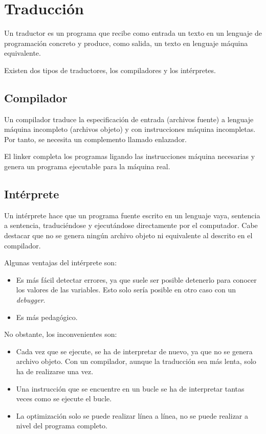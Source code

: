 \section{Traducción}
\begin{definicion}[Traductor]
    Un traductor es un programa que recibe como entrada un texto en un lenguaje de programación concreto y produce, como salida, un texto en lenguaje máquina equivalente.
\end{definicion}

Existen dos tipos de traductores, los compiladores y los intérpretes.
\subsection{Compilador}
\begin{definicion}[Compilador]
    Un compilador traduce la especificación de entrada (archivos fuente) a lenguaje máquina incompleto (archivos objeto) y con instrucciones máquina incompletas. Por tanto, se necesita un complemento llamado enlazador.
\end{definicion}
\begin{definicion}
    El linker completa los programas ligando las instrucciones máquina necesarias y genera un programa ejecutable para la máquina real.
\end{definicion}

\subsection{Intérprete}
\begin{definicion}[Intérprete]
    Un intérprete hace que un programa fuente escrito en un lenguaje vaya, sentencia a sentencia, traduciéndose y ejecutándose directamente por el computador. Cabe destacar que no se genera ningún archivo objeto ni equivalente al descrito en el compilador.
\end{definicion}

Algunas ventajas del intérprete son:
\begin{itemize}
    \item Es más fácil detectar errores, ya que suele ser posible detenerlo para conocer los valores de las variables. Esto solo sería posible en otro caso con un \textit{debugger}.

    \item Es más pedagógico.
\end{itemize}

No obstante, los inconvenientes son:
\begin{itemize}
    \item Cada vez que se ejecute, se ha de interpretar de nuevo, ya que no se genera archivo objeto. Con un compilador, aunque la traducción sea más lenta, solo ha de realizarse una vez.
    \item Una instrucción que se encuentre en un bucle se ha de interpretar tantas veces como se ejecute el bucle.
    \item La optimización solo se puede realizar línea a línea, no se puede realizar a nivel del programa completo.
\end{itemize}


